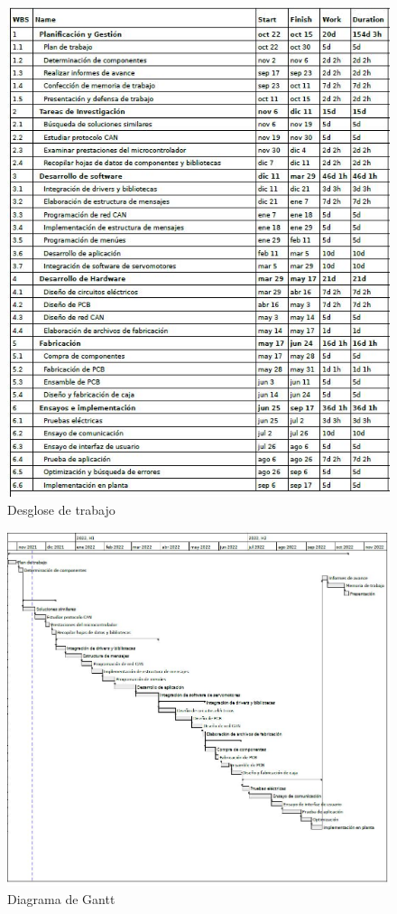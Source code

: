 \documentclass[
11pt, %
]{charter}
\begin{document}
\begin{figure}[htpb]
\centering 
\includegraphics[height=0.7\textheight]{./Figuras/WBS_GdP.JPG}
\caption{Desglose de trabajo}
\label{fig:WBSGantt}
\end{figure}


\begin{figure}[htpb]
\centering 
\includegraphics[height=0.65\textheight]{./Figuras/Gantt_GdP.JPG}
\caption{Diagrama de Gantt}
\label{fig:diagGantt}
\end{figure}
\end{document}
